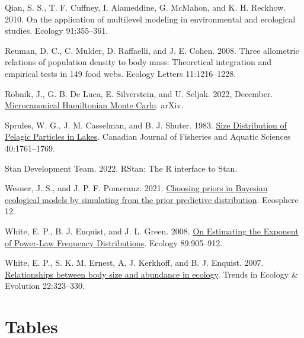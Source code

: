 \documentclass[
  12pt,
]{article}
\newlength{\cslhangindent}
\newlength{\cslentryspacingunit} %
\newenvironment{CSLReferences}[2] %
 {%
  \setlength{\parindent}{0pt}
  \ifodd #1
  \let\oldpar\par
  \def\par{\hangindent=\cslhangindent\oldpar}
  \fi
  \setlength{\parskip}{#2\cslentryspacingunit}
 }%
 {}
\numberwithin{equation}
\begin{document}
\begin{CSLReferences}{1}{0}
\leavevmode{}%
Qian, S. S., T. F. Cuffney, I. Alameddine, G. McMahon, and K. H.
Reckhow. 2010. On the application of multilevel modeling in
environmental and ecological studies. Ecology 91:355--361.

\leavevmode{}%
Reuman, D. C., C. Mulder, D. Raffaelli, and J. E. Cohen. 2008. Three
allometric relations of population density to body mass: Theoretical
integration and empirical tests in 149 food webs. Ecology Letters
11:1216--1228.

\leavevmode{}%
Robnik, J., G. B. De Luca, E. Silverstein, and U. Seljak. 2022,
December.
\href{https://doi.org/10.48550/arXiv.2212.08549}{Microcanonical
{Hamiltonian Monte Carlo}}. {arXiv}.

\leavevmode{}%
Sprules, W. G., J. M. Casselman, and B. J. Shuter. 1983.
\href{https://doi.org/10.1139/f83-205}{Size {Distribution} of {Pelagic
Particles} in {Lakes}}. Canadian Journal of Fisheries and Aquatic
Sciences 40:1761--1769.

\leavevmode{}%
Stan Development Team. 2022. {RStan}: The {R} interface to {Stan}.

\leavevmode{}%
Wesner, J. S., and J. P. F. Pomeranz. 2021.
\href{https://doi.org/10.1002/ecs2.3739}{Choosing priors in {Bayesian}
ecological models by simulating from the prior predictive distribution}.
Ecosphere 12.

\leavevmode{}%
White, E. P., B. J. Enquist, and J. L. Green. 2008.
\href{https://doi.org/10.1890/07-1288.1}{On {Estimating} the {Exponent}
of {Power-Law Frequency Distributions}}. Ecology 89:905--912.

\leavevmode{}%
White, E. P., S. K. M. Ernest, A. J. Kerkhoff, and B. J. Enquist. 2007.
\href{https://doi.org/10.1016/j.tree.2007.03.007}{Relationships between
body size and abundance in ecology}. Trends in Ecology \& Evolution
22:323--330.

\end{CSLReferences}

\newpage

\hypertarget{tables}{%
\section{Tables}\label{tables}}
\end{document}
